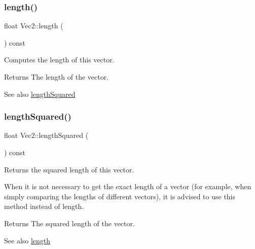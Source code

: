 \subsubsection{\texorpdfstring{length()}{length()}\hspace{0.1cm}{\footnotesize\ttfamily [2/2]}}
{\footnotesize\ttfamily float Vec2\+::length (\begin{DoxyParamCaption}{ }\end{DoxyParamCaption}) const}

Computes the length of this vector.

\begin{DoxyReturn}{Returns}
The length of the vector.
\end{DoxyReturn}
\begin{DoxySeeAlso}{See also}
\hyperlink{classVec2_a5dbc5e767907b2e217060479c52777bb}{length\+Squared} 
\end{DoxySeeAlso}
\mbox{\label{classVec2_a5dbc5e767907b2e217060479c52777bb}} 
\subsubsection{\texorpdfstring{length\+Squared()}{lengthSquared()}\hspace{0.1cm}{\footnotesize\ttfamily [1/2]}}
{\footnotesize\ttfamily float Vec2\+::length\+Squared (\begin{DoxyParamCaption}{ }\end{DoxyParamCaption}) const\hspace{0.3cm}{\ttfamily [inline]}}

Returns the squared length of this vector.

When it is not necessary to get the exact length of a vector (for example, when simply comparing the lengths of different vectors), it is advised to use this method instead of length.

\begin{DoxyReturn}{Returns}
The squared length of the vector.
\end{DoxyReturn}
\begin{DoxySeeAlso}{See also}
\hyperlink{classVec2_af9ebf7c8888fd5df9514e6d519b99fb2}{length} 
\end{DoxySeeAlso}
\mbox{\label{classVec2_a5dbc5e767907b2e217060479c52777bb}} 
